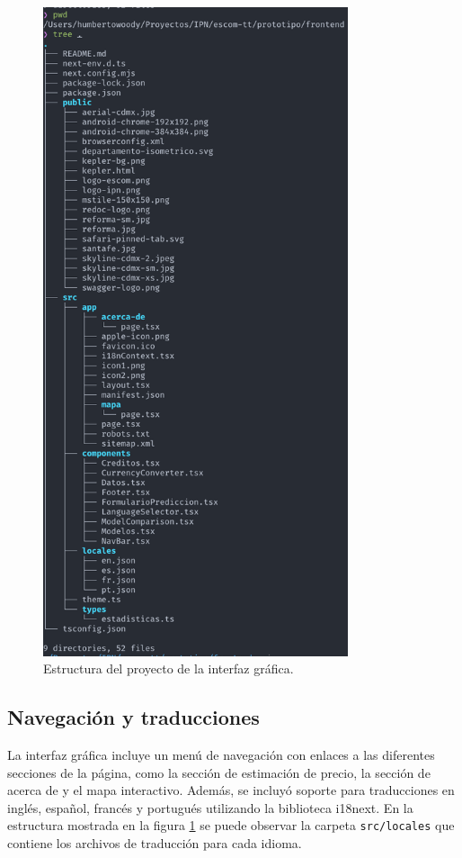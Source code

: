 \begin{figure}[H]
    \centering
    \includegraphics[width=0.8\textwidth]{imagenes/05-implementacion/interfaz-grafica/estructura-proyecto.png}
    \caption{Estructura del proyecto de la interfaz gráfica.}
    \label{fig:estructura-proyecto}
\end{figure}

\subsection{Navegación y traducciones}
La interfaz gráfica incluye un menú de navegación con enlaces a las diferentes
secciones de la página, como la sección de estimación de precio, la sección de
acerca de y el mapa interactivo. Además, se incluyó soporte para traducciones
en inglés, español, francés y portugués utilizando la biblioteca i18next. En la
estructura mostrada en la figura \ref{fig:estructura-proyecto} se puede observar
la carpeta \texttt{src/locales} que contiene los archivos de traducción para
cada idioma.

